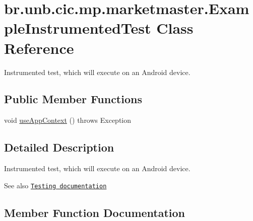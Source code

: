 \hypertarget{classbr_1_1unb_1_1cic_1_1mp_1_1marketmaster_1_1ExampleInstrumentedTest}{}\section{br.\+unb.\+cic.\+mp.\+marketmaster.\+Example\+Instrumented\+Test Class Reference}
\label{classbr_1_1unb_1_1cic_1_1mp_1_1marketmaster_1_1ExampleInstrumentedTest}


Instrumented test, which will execute on an Android device.  


\subsection*{Public Member Functions}
\begin{DoxyCompactItemize}
\item 
void \mbox{\hyperlink{classbr_1_1unb_1_1cic_1_1mp_1_1marketmaster_1_1ExampleInstrumentedTest_aa73cf10a5895d190585c88bd3fd82688}{use\+App\+Context}} ()  throws Exception 
\end{DoxyCompactItemize}


\subsection{Detailed Description}
Instrumented test, which will execute on an Android device. 

\begin{DoxySeeAlso}{See also}
\href{http://d.android.com/tools/testing}{\tt Testing documentation} 
\end{DoxySeeAlso}


\subsection{Member Function Documentation}
\mbox{\label{classbr_1_1unb_1_1cic_1_1mp_1_1marketmaster_1_1ExampleInstrumentedTest_aa73cf10a5895d190585c88bd3fd82688}} 
